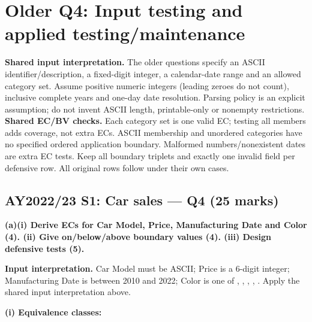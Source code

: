 \fontsize{9}{10.5}\selectfont
\par\Needspace{100pt}\section*{Older Q4: Input testing and applied testing/maintenance}\label{older-q4}
\begin{studycolumns}
\textbf{Shared input interpretation.} The older questions specify an ASCII identifier/description, a fixed-digit integer, a calendar-date range and an allowed category set. Assume positive numeric integers (leading zeroes do not count), inclusive complete years and one-day date resolution. Parsing policy is an explicit assumption; do not invent ASCII length, printable-only or nonempty restrictions.
\textbf{Shared EC/BV checks.} Each category set is one valid EC; testing all members adds coverage, not extra ECs. ASCII membership and unordered categories have no specified ordered application boundary. Malformed numbers/nonexistent dates are extra EC tests. Keep all boundary triplets and exactly one invalid field per defensive row. All original rows follow under their own cases.
\end{studycolumns}
\par\Needspace{85pt}\subsection*{AY2022/23 S1: Car sales --- Q4 (25 marks)}\label{old-2223-s1-q4}

\textbf{(a)(i) Derive ECs for Car Model, Price, Manufacturing Date and Color (4). (ii) Give on/\allowbreak{}below/\allowbreak{}above boundary values (4). (iii) Design defensive tests (5).}


\textbf{Input interpretation.} Car Model must be ASCII; Price is a 6-digit integer; Manufacturing Date is between 2010 and 2022; Color is one of , , , , . Apply the shared input interpretation above.

\textbf{(i) Equivalence classes:}




